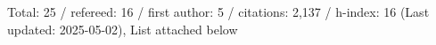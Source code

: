 Total: 25 / refereed: 16 / first author: 5 / citations: 2,137 / h-index: 16 (Last updated: 2025-05-02), List attached below